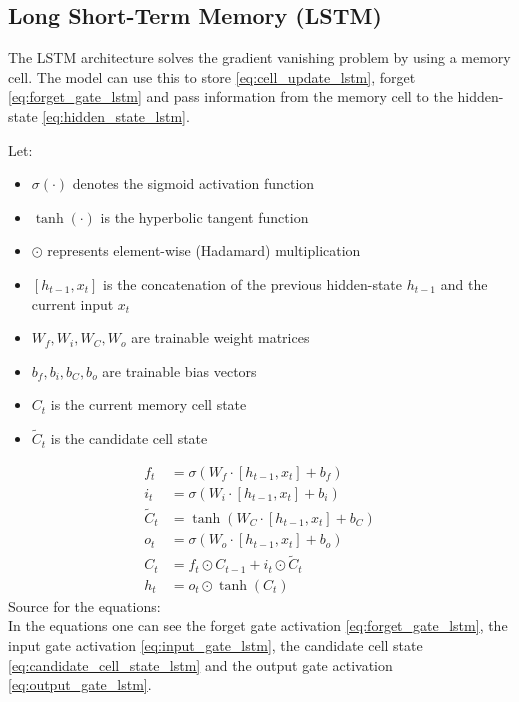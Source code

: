 \documentclass{article}
\begin{document}
\subsection{Long Short-Term Memory (LSTM)}
The LSTM architecture solves the gradient vanishing problem by using a memory cell. The model can use this to store \eqref{eq:cell_update_lstm}, forget \eqref{eq:forget_gate_lstm} and pass information from the memory cell to the hidden-state \eqref{eq:hidden_state_lstm}.

Let: 
\begin{itemize}
    \item $\sigma(\cdot)$ denotes the sigmoid activation function
    \item $\tanh(\cdot)$ is the hyperbolic tangent function
    \item $\odot$ represents element-wise (Hadamard) multiplication
    \item $[h_{t-1}, x_t]$ is the concatenation of the previous hidden-state $h_{t-1}$ and the current input $x_t$
    \item $W_f, W_i, W_C, W_o$ are trainable weight matrices
    \item $b_f, b_i, b_C, b_o$ are trainable bias vectors
    \item $C_t$ is the current memory cell state
    \item $\tilde{C}_t$ is the candidate cell state
\end{itemize}

\begin{align}
    f_t &= \sigma\!\left(W_f \cdot [h_{t-1}, x_t] + b_f\right) \label{eq:forget_gate_lstm} \\
    i_t &= \sigma\!\left(W_i \cdot [h_{t-1}, x_t] + b_i\right) \label{eq:input_gate_lstm} \\
    \tilde{C}_t &= \tanh\!\left(W_C \cdot [h_{t-1}, x_t] + b_C\right) \label{eq:candidate_cell_state_lstm} \\
    o_t &= \sigma\!\left(W_o \cdot [h_{t-1}, x_t] + b_o\right) \label{eq:output_gate_lstm}\\    
    C_t &= f_t \odot C_{t-1} + i_t \odot \tilde{C}_t \label{eq:cell_update_lstm}\\
    h_t &= o_t \odot \tanh(C_t) \label{eq:hidden_state_lstm}
\end{align}
Source for the equations: \cite{geeksforgeeks_lstm}
\\[2em]
In the equations one can see the forget gate activation \eqref{eq:forget_gate_lstm}, the input gate activation \eqref{eq:input_gate_lstm}, the candidate cell state \eqref{eq:candidate_cell_state_lstm} and the output gate activation \eqref{eq:output_gate_lstm}.
\end{document}
